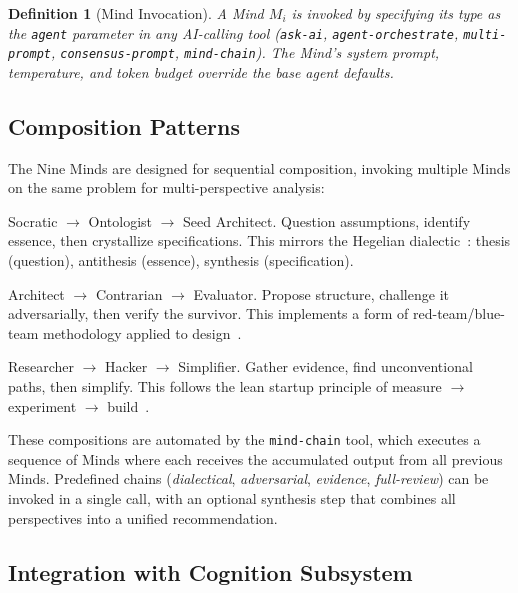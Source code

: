 \documentclass[journal,10pt]{IEEEtran}
\newcommand{\code}[1]{\texttt{#1}}
\newtheorem{definition}{Definition}
\begin{document}
\begin{definition}[Mind Invocation]
\label{def:mind}
A Mind $M_i$ is invoked by specifying its type as the \code{agent} parameter in any AI-calling tool (\code{ask-ai}, \code{agent-orchestrate}, \code{multi-prompt}, \code{consensus-prompt}, \code{mind-chain}). The Mind's system prompt, temperature, and token budget override the base agent defaults.
\end{definition}

\subsection{Composition Patterns}

The Nine Minds are designed for sequential composition, invoking multiple Minds on the same problem for multi-perspective analysis:

\begin{description}[nosep,style=unboxed,leftmargin=0pt,font=\normalfont\itshape]
\item[Dialectical Progression.] Socratic $\to$ Ontologist $\to$ Seed Architect. Question assumptions, identify essence, then crystallize specifications. This mirrors the Hegelian dialectic~\cite{hegel1807}: thesis (question), antithesis (essence), synthesis (specification).

\item[Adversarial Review.] Architect $\to$ Contrarian $\to$ Evaluator. Propose structure, challenge it adversarially, then verify the survivor. This implements a form of red-team/blue-team methodology applied to design~\cite{zenko2015redteam}.

\item[Evidence-Based Design.] Researcher $\to$ Hacker $\to$ Simplifier. Gather evidence, find unconventional paths, then simplify. This follows the lean startup principle of measure $\to$ experiment $\to$ build~\cite{ries2011lean}.
\end{description}

These compositions are automated by the \code{mind-chain} tool, which executes a sequence of Minds where each receives the accumulated output from all previous Minds. Predefined chains (\emph{dialectical}, \emph{adversarial}, \emph{evidence}, \emph{full-review}) can be invoked in a single call, with an optional synthesis step that combines all perspectives into a unified recommendation.

\subsection{Integration with Cognition Subsystem}
\end{document}
